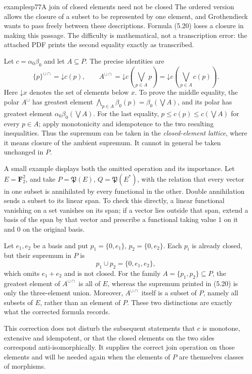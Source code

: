 \begin{dcomment}{examples}{p77}{A join of closed elements need not be closed}
The ordered version allows the closure of a subset to be represented by one element, and Grothendieck wants to pass freely between these descriptions. Formula (5.20) loses a closure in making this passage. The difficulty is mathematical, not a transcription error: the attached PDF prints the second equality exactly as transcribed.

Let $c=\alpha_0\beta_0$ and let $A\subseteq P$. The precise identities are
\[
 \{p\}^{\cup\cap}=\mathord\downarrow c(p),\qquad
 A^{\cup\cap}=\mathord\downarrow c\left(\bigvee_{p\in A}p\right)
 =\mathord\downarrow c\left(\bigvee_{p\in A}c(p)\right).
\]
Here $\mathord\downarrow x$ denotes the set of elements below $x$. To prove the middle equality, the polar $A^\cup$ has greatest element
$\bigwedge_{p\in A}\beta_0(p)=\beta_0(\bigvee A)$, and its polar has greatest element $\alpha_0\beta_0(\bigvee A)$. For the last equality, $p\leq c(p)\leq c(\bigvee A)$ for every $p\in A$; apply monotonicity and idempotence to the two resulting inequalities. Thus the supremum can be taken in the \emph{closed-element lattice}, where it means closure of the ambient supremum. It cannot in general be taken unchanged in $P$.

A small example displays both the omitted operation and its importance. Let $E=\mathbf F_2^2$, and take $P=\mathfrak P(E)$, $Q=\mathfrak P(E^*)$, with the relation that every vector in one subset is annihilated by every functional in the other. Double annihilation sends a subset to its linear span. To check this directly, a linear functional vanishing on a set vanishes on its span; if a vector lies outside that span, extend a basis of the span by that vector and prescribe a functional taking value $1$ on it and $0$ on the original basis.

Let $e_1,e_2$ be a basis and put $p_1=\{0,e_1\}$, $p_2=\{0,e_2\}$. Each $p_i$ is already closed, but their supremum in $P$ is
\[
 p_1\cup p_2=\{0,e_1,e_2\},
\]
which omits $e_1+e_2$ and is not closed. For the family $A=\{p_1,p_2\}\subseteq P$, the greatest element of $A^{\cup\cap}$ is all of $E$, whereas the supremum printed in (5.20) is only the three-element union. Moreover, $A^{\cup\cap}$ itself is a subset of $P$, namely all subsets of $E$, rather than an element of $P$. These two distinctions are exactly what the corrected formula records.

This correction does not disturb the subsequent statements that $c$ is monotone, extensive and idempotent, or that the closed elements on the two sides correspond anti-isomorphically. It supplies the correct join operation on those elements and will be needed again when the elements of $P$ are themselves classes of morphisms.
\end{dcomment}

